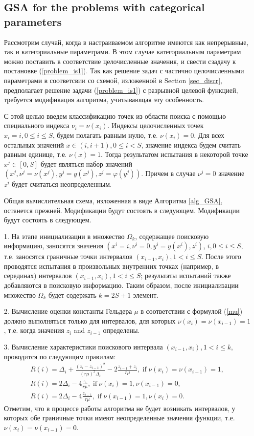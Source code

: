 \documentclass[preprint,12pt]{elsarticle}
\begin{document}
\subsection{GSA for the problems with categorical parameters}
\label{sec_mGSA}

Рассмотрим случай, когда в настраиваемом алгоритме имеются как непрерывные, так и категориальные параметрами. 
В этом случае категориальным параметрам можно поставить в соответствие целочисленные значения, и свести сзадачу к постановке (\ref{problem_is1}).
Так как решение задач с частично целочисленными параметрами в соответсвии со схемой, изложенной в Section \ref{sec_discr}, предполагает решение задачи (\ref{problem_is1}) с разрывной целевой функцией, требуется модификация алгоритма, учитывающая эту особенность.

С этой целью введем классификацию точек из области поиска с помощью специального индекса $\nu_i=\nu(x_i)$.
Индексы целочисленных точек $x_i = i, 0\leq i \leq S$, будем полагать равным нулю, т.е. $\nu(x_i) = 0$. Для всех остальных значений $x\in(i,i+1),  0 \leq i < S$, значение индекса будем считать равным единице, т.е. $\nu(x) = 1$. Тогда результатом испытания в некоторой точке $x^j\in[0,S]$ будет являться набор значений
$(x^j, \nu^j=\nu(x^j), y^j=y(x^j), z^j = \varphi(y^j))$. Причем в случае $\nu^j=0$ значение $z^j$ будет считаться неопределенным.

Общая вычислительная схема, изложенная в виде Алгоритма \ref{alg_GSA}, останется прежней. Модификации будут состоять в следующем.
Модификации будут состоять в следующем.

1. На этапе инициализации в множество $\Omega_k$, содержащее поисковую информацию, заносятся значения $(x^i = i, \nu^i=0, y^i=y(x^i), z^i)$, $ i, 0\leq i \leq S$, т.е. заносятся граничные точки интервалов $(x_{i-1},x_i), 1<i\leq S$.
После этого проводятся испытания в произвольных внутренних точках (например, в серединах) интервалов $(x_{i-1},x_i), 1<i\leq S$; результаты испытаний также добавляются в поисковую информацию. 
Таким образом, после инициализации множество $\Omega_k$ будет содержать $k=2S+1$ элемент.

2. Вычисление оценки константы Гельдера $\mu$ в соответствии с формулой (\ref{mu}) должно выполняться только для  интервалов, для которых $\nu(x_i) = \nu(x_{i-1}) = 1$, т.е. когда значения $z_i$ and $z_{i-1}$ определены.

3. Вычисление характеристики поискового интервала $(x_{i-1},x_i), 1<i\leq k$, проводится по следующим правилам:
\begin{gather}\label{R_int}
R(i) = \Delta_i + \frac{(z_i-z_{i-1})^2}{(r\mu)^2\Delta_i}-2\frac{z_{i-1}+z_i}{r\mu}, \; \mathrm{if} \; \nu(x_i) = \nu(x_{i-1}) = 1, \nonumber \\ 
R(i) = 2\Delta_i-4\frac{z_i}{r\mu}, \; \mathrm{if} \;  \nu(x_i) = 1, \nu(x_{i-1}) = 0, \nonumber \\ 
R(i) = 2\Delta_i-4\frac{z_{i-1}}{r\mu}, \; \mathrm{if} \;  \nu(x_{i-1}) = 1, \nu(x_{i}) = 0. \nonumber
\end{gather}
Отметим, что в процессе работы алгоритма не будет возникать интервалов, у которых обе граничные точки имеют неопределенные значения функции, т.е. $\nu(x_i) = \nu(x_{i-1}) = 0$.
\end{document}
